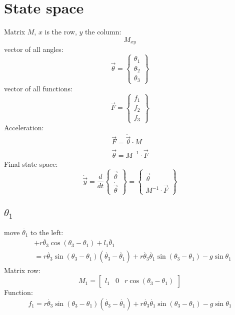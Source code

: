 \documentclass[titlepage]{article}
\numberwithin{equation}{section}
\begin{document}
\section{State space}
Matrix $M$, $x$ is the row, $y$ the column:
\begin{equation}
M_{xy}
\end{equation}
vector of all angles:
\begin{equation}
\overrightarrow{\theta} = \left\{\!
\begin{array}{c}
  \theta_1 \\
  \theta_2 \\
  \theta_3
\end{array}
\!\right\}
\end{equation}
vector of all functions:
\begin{equation}
\overrightarrow{F} = \left\{\!
\begin{array}{c}
  f_1 \\
  f_2 \\
  f_3
\end{array}
\!\right\}
\end{equation}
Acceleration:
\begin{align}
\overrightarrow{F} = \ddot{\overrightarrow{\theta}} \cdot M \\
\ddot{\overrightarrow{\theta}} = M^{-1} \cdot \overrightarrow{F}
\end{align}
Final state space:
\begin{equation}
\dot{\overrightarrow{y}} = \frac{d}{dt}
\left\{\!
\begin{array}{c}
  \overrightarrow{\theta} \\
  \dot{\overrightarrow{\theta}}
\end{array}
\!\right\} = 
\left\{\!
\begin{array}{c}
  \dot{\overrightarrow{\theta}} \\
  M^{-1} \cdot \overrightarrow{F}
\end{array}
\!\right\}
\end{equation}

\pagebreak
\subsection{$\theta_1$}
move $\ddot{\theta_1}$ to the left:
\begin{align}
 &+ r \ddot{\theta_3} \cos{(\theta_3 - \theta_1)} + l_1 \ddot{\theta_1} \nonumber \\
 &= r \dot{\theta_3} \sin{(\theta_3 - \theta_1)} (\dot{\theta_3} - \dot{\theta_1}) + r \dot{\theta_3} \dot{\theta_1} \sin{(\theta_3 - \theta_1)} - g \sin \theta_1
\end{align}
Matrix row:
\begin{equation}
M_1 = \begin{bmatrix}
      l_1 & 0 & r \cos{(\theta_3 - \theta_1)}
      \end{bmatrix}
\end{equation}
Function:
\begin{equation}
f_1 = r \dot{\theta_3} \sin{(\theta_3 - \theta_1)} (\dot{\theta_3} - \dot{\theta_1}) + r \dot{\theta_3} \dot{\theta_1} \sin{(\theta_3 - \theta_1)} - g \sin \theta_1
\end{equation}
\end{document}
